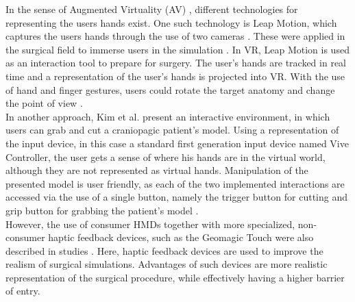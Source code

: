 In the sense of Augmented Virtuality (AV) \cite{milgram1994taxonomy}, different technologies for representing the users hands exist.
One such technology is Leap Motion, which captures the users hands through the use of two cameras \cite{LeapMotion}.
These were applied in the surgical field to immerse users in the simulation \cite{VenkataS.Arikatla.2018,Sampogna.2017}.
In VR, Leap Motion is used as an interaction tool to prepare for surgery.
The user's hands are tracked in real time and a representation of the user's hands is projected into VR.
With the use of hand and finger gestures, users could rotate the target anatomy and change the point of view \cite{Sampogna.2017}.
\\ In another approach, Kim et al. \cite{kim2017virtual} present an interactive environment, in which users can grab and cut a craniopagic patient's model.
Using a representation of the input device, in this case a standard first generation input device named Vive Controller, the user gets a sense of where 
his hands are in the virtual world, although they are not represented as virtual hands. 
Manipulation of the presented model is user friendly, as each of the two implemented interactions are accessed via the use of a single button, namely the 
trigger button for cutting and grip button for grabbing the patient's model \cite{.2017}.
\\ However, the use of consumer HMDs together with more specialized, non-consumer haptic feedback devices, such as the Geomagic Touch were also described in studies \cite{VenkataS.Arikatla.2018}.
Here, haptic feedback devices are used to improve the realism of surgical simulations.
Advantages of such devices are more realistic representation of the surgical procedure, while effectively having a higher barrier of entry.
